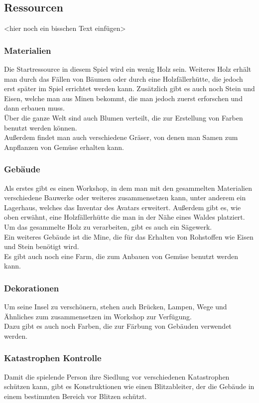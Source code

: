 \documentclass[paper=A4,pagesize=auto,12pt,headinclude=true,footinclude=true,BCOR=0mm,DIV=calc]{scrartcl}
\newcommand{\sectionspace}{
	\vspace{0.5cm}
}
\begin{document}


\sectionspace
\subsection{Ressourcen}\label{sec:Ressourcen}
<hier noch ein bisschen Text einfügen>

\subsubsection{Materialien}
Die Startressource in diesem Spiel wird ein wenig Holz sein. Weiteres Holz erhält man durch das Fällen von Bäumen oder durch eine Holzfällerhütte, die jedoch erst später im Spiel errichtet werden kann. Zusätzlich gibt es auch noch Stein und Eisen, welche man aus Minen bekommt, die man jedoch zuerst erforschen und dann erbauen muss.\\
Über die ganze Welt sind auch Blumen verteilt, die zur Erstellung von Farben benutzt werden können.\\
Außerdem findet man auch verschiedene Gräser, von denen man Samen zum Anpflanzen von Gemüse erhalten kann. 

\subsubsection{Gebäude}
Als erstes gibt es einen Workshop, in dem man mit den gesammelten Materialien verschiedene Bauwerke oder weiteres zusammensetzen kann, unter anderem ein Lagerhaus, welches das Inventar des Avatars erweitert. Außerdem gibt es, wie oben erwähnt, eine Holzfällerhütte die man in der Nähe eines Waldes platziert. Um das gesammelte Holz zu verarbeiten, gibt es auch ein Sägewerk.\\
Ein weiteres Gebäude ist die Mine, die für das Erhalten von Rohstoffen wie Eisen und Stein benötigt wird.\\
Es gibt auch noch eine Farm, die zum Anbauen von Gemüse benutzt werden kann.

\subsubsection{Dekorationen}
Um seine Insel zu verschönern, stehen auch Brücken, Lampen, Wege und Ähnliches zum zusammensetzen im Workshop zur Verfügung.\\
Dazu gibt es auch noch Farben, die zur Färbung von Gebäuden verwendet werden.

\subsubsection{Katastrophen Kontrolle}
Damit die spielende Person ihre Siedlung vor verschiedenen Katastrophen schützen kann, gibt es Konstruktionen wie einen Blitzableiter, der die Gebäude in einem bestimmten Bereich vor Blitzen schützt.
\end{document}
